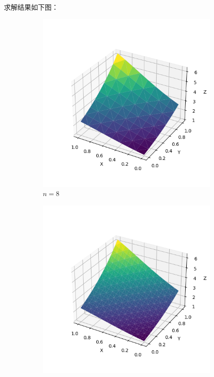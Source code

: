 \documentclass[lang=cn,a4paper,newtx,bibend=bibtex]{elegantpaper}
\begin{document}
求解结果如下图：

\begin{figure}[H]
  \centering
  \begin{subfigure}[b]{0.18\textwidth}
      \includegraphics[width=\textwidth]{../../res_bac/res-[data|1-Neumann-regular-a8].png}
      \caption{$n =  8$}
  \end{subfigure}
  \hfill
  \begin{subfigure}[b]{0.18\textwidth}
      \includegraphics[width=\textwidth]{../../res_bac/res-[data|1-Neumann-regular-b16].png}

\end{subfigure}
\end{figure}
\end{document}
